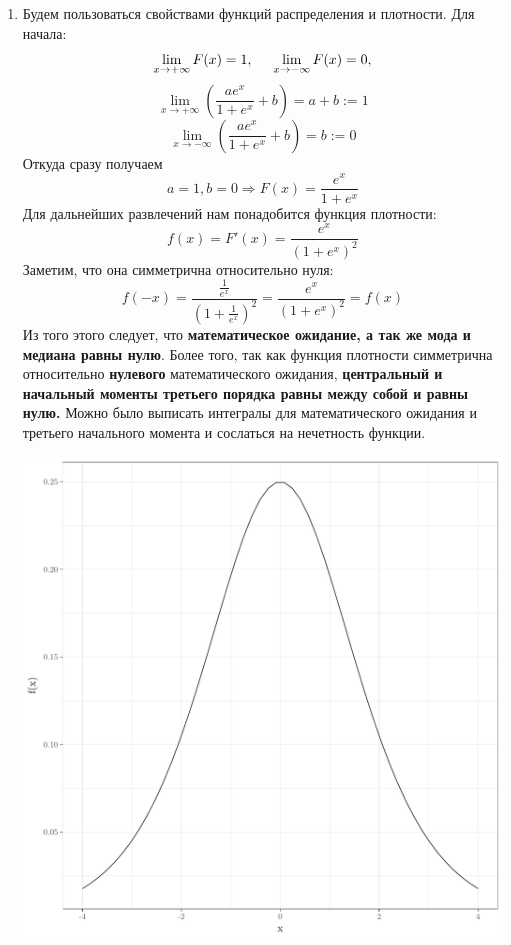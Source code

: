 \begin{enumerate}
\item
Будем пользоваться свойствами функций распределения и плотности. Для начала:
\[
\lim\limits_{x \rightarrow +\infty} F(x) = 1, \hspace{0.5cm} \lim\limits_{x \rightarrow -\infty} F(x) = 0,
\]
\[
\lim\limits_{x \rightarrow +\infty} \left(\frac{ae^x}{1+e^x}+b\right) = a+b := 1
\]
\[
\lim\limits_{x \rightarrow -\infty} \left(\frac{ae^x}{1+e^x}+b\right) = b :=0
\]
Откуда сразу получаем
\[
a =1, b = 0 \Rightarrow F(x) = \frac{e^x}{1+e^x}
\]
Для дальнейших развлечений нам понадобится функция плотности:
\[
f(x) = F'(x) = \frac{e^x}{(1+e^x)^2}
\]
Заметим, что она симметрична относительно нуля:
\[
f(-x) = \frac{\frac{1}{e^x}}{\left(1+\frac{1}{e^x}\right)^2} = \frac{e^x}{(1+e^x)^2} = f(x)
\]
Из того этого следует, что \textbf{математическое ожидание, а так же мода и медиана
равны нулю}. Более того, так как функция плотности симметрична относительно
\textbf{нулевого} математического ожидания, \textbf{центральный и начальный моменты
третьего порядка равны между собой и равны нулю.} Можно было выписать интегралы
для математического ожидания и третьего начального момента и сослаться на нечетность функции.

\begin{minipage}{0.6\textwidth}
\begin{center}
\includegraphics[scale=0.5]{auto_figures_tikz/2014_2015_fig_01_dlogis.pdf}
\end{center}
\end{minipage}
\end{enumerate}


